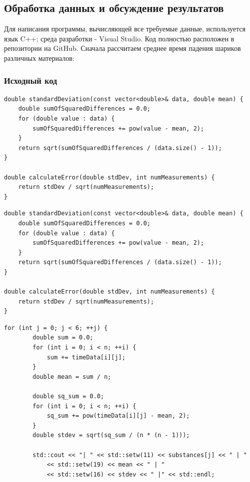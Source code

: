 \subsection{Обработка данных и обсуждение результатов}
Для написания программы, вычисляющей все требуемые данные, используется язык C++; среда разработки - Visual Studio.
Код полностью расположен в репозитории на GitHub.
Сначала рассчитаем среднее время падения шариков различных материалов:
\subsubsection{Исходный код} 

\begin{lstlisting}[label=listing1, caption=Функция для вычисления стандартного отклонения]
double standardDeviation(const vector<double>& data, double mean) {
    double sumOfSquaredDifferences = 0.0;
    for (double value : data) {
        sumOfSquaredDifferences += pow(value - mean, 2);
    }
    return sqrt(sumOfSquaredDifferences / (data.size() - 1));
}

double calculateError(double stdDev, int numMeasurements) {
    return stdDev / sqrt(numMeasurements);
}

\end{lstlisting}


\begin{lstlisting}[label=listing1, caption=Функция для вычисления массы шариков]
double standardDeviation(const vector<double>& data, double mean) {
    double sumOfSquaredDifferences = 0.0;
    for (double value : data) {
        sumOfSquaredDifferences += pow(value - mean, 2);
    }
    return sqrt(sumOfSquaredDifferences / (data.size() - 1));
}

double calculateError(double stdDev, int numMeasurements) {
    return stdDev / sqrt(numMeasurements);
}
\end{lstlisting}

\begin{lstlisting}[label=listing1, caption=Функция для вычисления погрешности времени]
 for (int j = 0; j < 6; ++j) {
        double sum = 0.0;
        for (int i = 0; i < n; ++i) {
            sum += timeData[i][j];
        }
        double mean = sum / n;

        double sq_sum = 0.0;
        for (int i = 0; i < n; ++i) {
            sq_sum += pow(timeData[i][j] - mean, 2);
        }
        double stdev = sqrt(sq_sum / (n * (n - 1)));

        std::cout << "| " << std::setw(11) << substances[j] << " | "
            << std::setw(19) << mean << " | "
            << std::setw(16) << stdev << " |" << std::endl;
\end{lstlisting}

